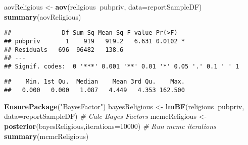 \documentclass[]{article}
\newenvironment{Shaded}{\begin{snugshade}}{\end{snugshade}}
\newcommand{\CommentTok}[1]{\textcolor[rgb]{0.56,0.35,0.01}{\textit{#1}}}
\newcommand{\DataTypeTok}[1]{\textcolor[rgb]{0.13,0.29,0.53}{#1}}
\newcommand{\DecValTok}[1]{\textcolor[rgb]{0.00,0.00,0.81}{#1}}
\newcommand{\KeywordTok}[1]{\textcolor[rgb]{0.13,0.29,0.53}{\textbf{#1}}}
\newcommand{\NormalTok}[1]{#1}
\newcommand{\OperatorTok}[1]{\textcolor[rgb]{0.81,0.36,0.00}{\textbf{#1}}}
\newcommand{\StringTok}[1]{\textcolor[rgb]{0.31,0.60,0.02}{#1}}
\begin{document}
\begin{Shaded}
\begin{Highlighting}[]
\NormalTok{aovReligious <-}\StringTok{ }\KeywordTok{aov}\NormalTok{(religious}\OperatorTok{~}\NormalTok{pubpriv, }\DataTypeTok{data=}\NormalTok{reportSampleDF)}
\KeywordTok{summary}\NormalTok{(aovReligious)}
\end{Highlighting}
\end{Shaded}

\begin{verbatim}
##              Df Sum Sq Mean Sq F value Pr(>F)  
## pubpriv       1    919   919.2   6.631 0.0102 *
## Residuals   696  96482   138.6                 
## ---
## Signif. codes:  0 '***' 0.001 '**' 0.01 '*' 0.05 '.' 0.1 ' ' 1
\end{verbatim}

\begin{Shaded}
\end{Shaded}

\begin{verbatim}
##    Min. 1st Qu.  Median    Mean 3rd Qu.    Max. 
##   0.000   0.000   1.087   4.449   4.353 162.500
\end{verbatim}

\begin{Shaded}
\begin{Highlighting}[]
\KeywordTok{EnsurePackage}\NormalTok{(}\StringTok{"BayesFactor"}\NormalTok{)}
\NormalTok{bayesReligious <-}\StringTok{ }\KeywordTok{lmBF}\NormalTok{(religious}\OperatorTok{~}\NormalTok{pubpriv, }\DataTypeTok{data=}\NormalTok{reportSampleDF) }\CommentTok{# Calc Bayes Factors}
\NormalTok{mcmcReligious <-}\StringTok{ }\KeywordTok{posterior}\NormalTok{(bayesReligious,}\DataTypeTok{iterations=}\DecValTok{10000}\NormalTok{)  }\CommentTok{# Run mcmc iterations}
\KeywordTok{summary}\NormalTok{(mcmcReligious)}
\end{Highlighting}
\end{Shaded}
\end{document}
